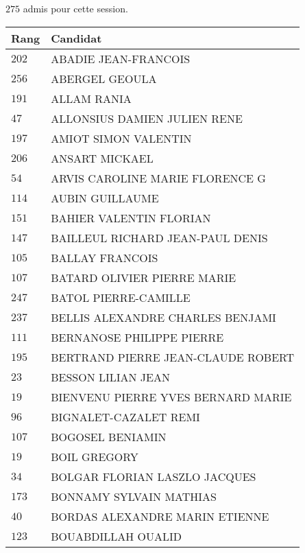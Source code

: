 




  $275$ admis pour cette session.

  \begin{xltabular}{\linewidth}{|l|X|}
    \hline
    \textbf{Rang} & \textbf{Candidat} \\
    \hline
    $202$ & ABADIE JEAN-FRANCOIS \\
    \hline
    $256$ & ABERGEL GEOULA \\
    \hline
    $191$ & ALLAM RANIA \\
    \hline
    $47$ & ALLONSIUS DAMIEN JULIEN RENE \\
    \hline
    $197$ & AMIOT SIMON VALENTIN \\
    \hline
    $206$ & ANSART MICKAEL \\
    \hline
    $54$ & ARVIS CAROLINE MARIE FLORENCE G \\
    \hline
    $114$ & AUBIN GUILLAUME \\
    \hline
    $151$ & BAHIER VALENTIN FLORIAN \\
    \hline
    $147$ & BAILLEUL RICHARD JEAN-PAUL DENIS \\
    \hline
    $105$ & BALLAY FRANCOIS \\
    \hline
    $107$ & BATARD OLIVIER PIERRE MARIE \\
    \hline
    $247$ & BATOL PIERRE-CAMILLE \\
    \hline
    $237$ & BELLIS ALEXANDRE CHARLES BENJAMI \\
    \hline
    $111$ & BERNANOSE PHILIPPE PIERRE \\
    \hline
    $195$ & BERTRAND PIERRE JEAN-CLAUDE ROBERT \\
    \hline
    $23$ & BESSON LILIAN JEAN \\
    \hline
    $19$ & BIENVENU PIERRE YVES BERNARD MARIE \\
    \hline
    $96$ & BIGNALET-CAZALET REMI \\
    \hline
    $107$ & BOGOSEL BENIAMIN \\
    \hline
    $19$ & BOIL GREGORY \\
    \hline
    $34$ & BOLGAR FLORIAN LASZLO JACQUES \\
    \hline
    $173$ & BONNAMY SYLVAIN MATHIAS \\
    \hline
    $40$ & BORDAS ALEXANDRE MARIN ETIENNE \\
    \hline
    $123$ & BOUABDILLAH OUALID \\

\end{xltabular}
